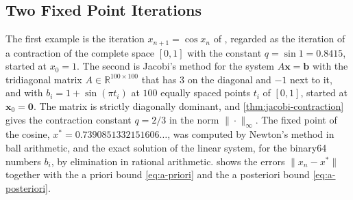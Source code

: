 \subsection{Two Fixed Point Iterations}

The first example is the iteration $x_{n+1}=\cos x_n$ of , regarded as the iteration of a contraction of the complete space $[0,1]$ with the constant $q=\sin1=0.8415$, started at $x_0=1$. The second is Jacobi's method for the system $A\mathbf x=\mathbf b$ with the tridiagonal matrix $A\in\mathbb R^{100\times100}$ that has $3$ on the diagonal and $-1$ next to it, and with $b_i=1+\sin(\pi t_i)$ at $100$ equally spaced points $t_i$ of $[0,1]$, started at $\mathbf x_0=\mathbf 0$. The matrix is strictly diagonally dominant, and \cref{thm:jacobi-contraction} gives the contraction constant $q=2/3$ in the norm $\|\cdot\|_\infty$. The fixed point of the cosine, $x^*=0.7390851332151606\ldots$, was computed by Newton's method in ball arithmetic, and the exact solution of the linear system, for the binary64 numbers $b_i$, by elimination in rational arithmetic.  shows the errors $\|x_n-x^*\|$ together with the a priori bound \eqref{eq:a-priori} and the a posteriori bound \eqref{eq:a-posteriori}.

